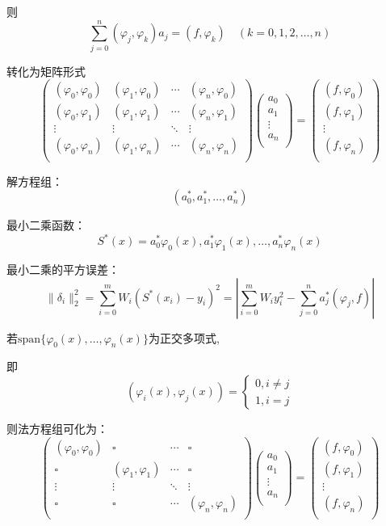 \documentclass[UTF8,a4paper,11pt,oneside]{ctexbook}
\begin{document}
则
\[
\sum_{j=0}^n(\varphi_j,\varphi_k)a_j=(f,\varphi_k)\quad(k=0,1,2,\ldots,n)
\]

转化为矩阵形式
\[
\begin{pmatrix}
    (\varphi_0,\varphi_0) & (\varphi_1,\varphi_0) & \cdots & (\varphi_n,\varphi_0)\\
    (\varphi_0,\varphi_1) & (\varphi_1,\varphi_1) & \cdots & (\varphi_n,\varphi_1)\\
    \vdots & \vdots & \ddots & \vdots\\
    (\varphi_0,\varphi_n) & (\varphi_1,\varphi_n) & \cdots & (\varphi_n,\varphi_n)\\
\end{pmatrix}
\begin{pmatrix}
    a_0\\
    a_1\\
    \vdots\\
    a_n\\
\end{pmatrix}
=
\begin{pmatrix}
    (f,\varphi_0)\\
    (f,\varphi_1)\\
    \vdots\\
    (f,\varphi_n)\\
\end{pmatrix}
\]

解方程组：
\[
(a_0^*,a_1^*,\ldots,a_n^*)
\]

最小二乘函数：
\[
S^*(x)=a_0^*\varphi_0(x),a_1^*\varphi_1(x),\ldots,a_n^*\varphi_n(x)
\]

最小二乘的平方误差： 
\[
\|\delta_i\|_2^2=\sum_{i=0}^mW_i(S^*(x_i)-y_i)^2=\left|\sum_{i=0}^mW_iy_i^2-\sum_{j=0}^na_j^*(\varphi_j,f)\right|
\]

若\(\mathrm{span}\{\varphi_0(x),\ldots,\varphi_n(x)\}\)为正交多项式, 

即
\[
(\varphi_i(x),\varphi_j(x))=
\begin{cases}
    0,i\neq j\\
    1,i=j
\end{cases}
\]

则法方程组可化为：
\[
\begin{pmatrix}
    (\varphi_0,\varphi_0) & \square & \cdots & \square\\
    \square & (\varphi_1,\varphi_1) & \cdots & \square\\
    \vdots & \vdots & \ddots & \vdots\\
    \square & \square & \cdots & (\varphi_n,\varphi_n)\\
\end{pmatrix}
\begin{pmatrix}
    a_0\\
    a_1\\
    \vdots\\
    a_n\\
\end{pmatrix}
=
\begin{pmatrix}
    (f,\varphi_0)\\
    (f,\varphi_1)\\
    \vdots\\
    (f,\varphi_n)\\
\end{pmatrix}
\]
\end{document}
